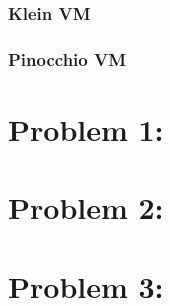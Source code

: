 \subsubsection{Klein VM}
\subsubsection{Pinocchio VM}


\section{Problem 1: }


\section{Problem 2: }


\section{Problem 3: }



